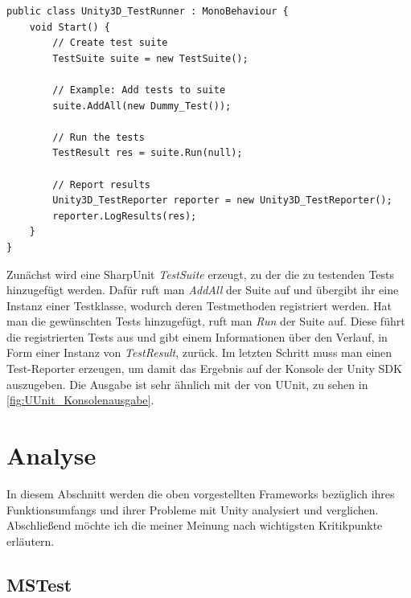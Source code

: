\begin{lstlisting}[caption={[Einbindung der Tests mit SharpUnit]Einbindung der Tests mit SharpUnit\\
Quelle: Demo von SharpUnit, erhältlich unter \url{https://github.com/mgants4/SharpUnit}.}, label=code:SharpUnitTestRunner]
public class Unity3D_TestRunner : MonoBehaviour {
	void Start() {
        // Create test suite
        TestSuite suite = new TestSuite();

        // Example: Add tests to suite
        suite.AddAll(new Dummy_Test());

        // Run the tests
        TestResult res = suite.Run(null);

        // Report results
        Unity3D_TestReporter reporter = new Unity3D_TestReporter();
        reporter.LogResults(res);
	}
}
\end{lstlisting}

Zunächst wird eine SharpUnit \textit{TestSuite} erzeugt, zu der die zu testenden Tests hinzugefügt werden. Dafür ruft man \textit{AddAll} der Suite auf und übergibt ihr eine Instanz einer Testklasse, wodurch deren Testmethoden registriert werden. Hat man die gewünschten Tests hinzugefügt, ruft man \textit{Run} der Suite auf. Diese führt die registrierten Tests aus und gibt einem Informationen über den Verlauf, in Form einer Instanz von \textit{TestResult}, zurück. Im letzten Schritt muss man einen Test-Reporter erzeugen, um damit das Ergebnis auf der Konsole der Unity SDK auszugeben. Die Ausgabe ist sehr ähnlich mit der von UUnit, zu sehen in \autoref{fig:UUnit_Konsolenausgabe}.
\pagebreak

\section{Analyse}\label{sec:Analyse}

In diesem Abschnitt werden die oben vorgestellten Frameworks bezüglich ihres Funktionsumfangs und ihrer Probleme mit Unity analysiert und verglichen. Abschließend möchte ich die meiner Meinung nach wichtigsten Kritikpunkte erläutern.

\subsection{MSTest}

